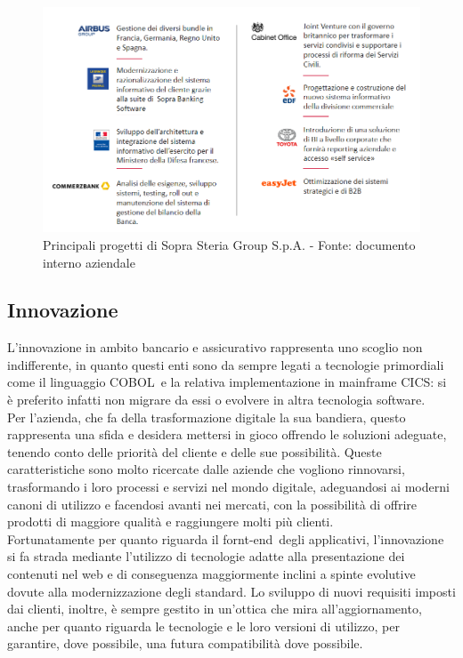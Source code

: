 	\begin{figure}[H]
	\centering
   	\includegraphics[width=1\textwidth]{immagini/Progetti_Importanti}
   	\caption{Principali progetti di Sopra Steria Group S.p.A. - Fonte: documento interno aziendale}
	\end{figure}

	
	\subsection{Innovazione}
	
	L'innovazione in ambito bancario e assicurativo rappresenta uno scoglio non indifferente, in quanto questi enti sono da sempre legati a tecnologie primordiali come il linguaggio COBOL\glossario\ e la relativa implementazione in mainframe CICS\glossario : si è preferito infatti non migrare da essi o evolvere in altra tecnologia software.\\
	
	Per l'azienda, che fa della trasformazione digitale la sua bandiera, questo rappresenta una sfida e desidera mettersi in gioco offrendo le soluzioni adeguate, tenendo conto delle priorità del cliente e delle sue possibilità. Queste caratteristiche sono molto ricercate dalle aziende che vogliono rinnovarsi, trasformando i loro processi e servizi nel mondo digitale, adeguandosi ai moderni canoni di utilizzo e facendosi avanti nei mercati, con la possibilità di offrire prodotti di maggiore qualità e raggiungere molti più clienti.\\
	
	Fortunatamente per quanto riguarda il fornt-end\glossario\ degli applicativi, l'innovazione si fa strada mediante l'utilizzo di tecnologie adatte alla presentazione dei contenuti	nel web e di conseguenza maggiormente inclini a spinte evolutive dovute alla modernizzazione degli standard. Lo sviluppo di nuovi requisiti imposti dai clienti, inoltre, è sempre gestito in un'ottica che mira all'aggiornamento, anche per quanto riguarda le tecnologie e le loro versioni di utilizzo, per garantire, dove possibile, una futura compatibilità dove possibile.